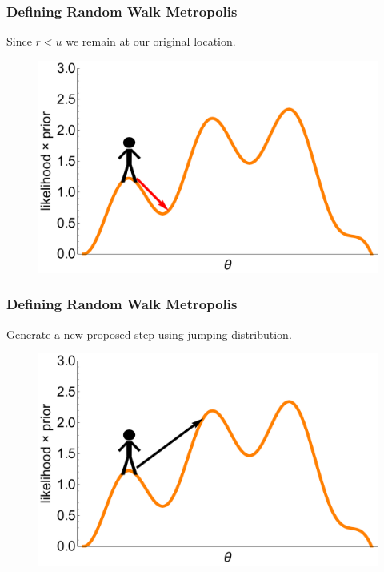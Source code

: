 \documentclass[handout]{beamer}
\begin{document}
\begin{frame}
\frametitle{Defining Random Walk Metropolis}
Since $r < u$ we remain at our original location.

\begin{figure}[ht]
\centerline{\includegraphics[width=1\textwidth]{animations_figures/lec4_metropolisDefinition5.pdf}}
\end{figure}

\end{frame}

\begin{frame}
\frametitle{Defining Random Walk Metropolis}
Generate a new proposed step using jumping distribution.

\begin{figure}[ht]
\centerline{\includegraphics[width=1\textwidth]{animations_figures/lec4_metropolisDefinition6.pdf}}
\end{figure}

\end{frame}
\end{document}
